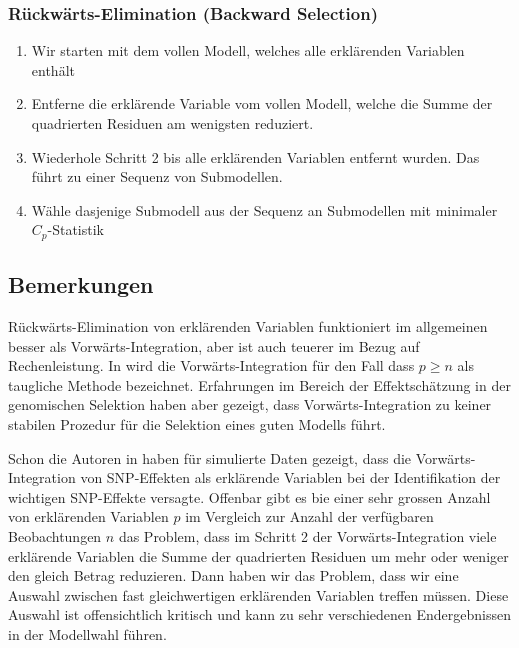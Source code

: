 \documentclass[]{book}
\providecommand{\tightlist}{%
  \setlength{\itemsep}{0pt}\setlength{\parskip}{0pt}}
\begin{document}
\subsubsection{Rückwärts-Elimination (Backward
Selection)}\label{ruckwarts-elimination-backward-selection}

\begin{enumerate}
\def\labelenumi{\arabic{enumi}.}
\tightlist
\item
  Wir starten mit dem vollen Modell, welches alle erklärenden Variablen
  enthält
\item
  Entferne die erklärende Variable vom vollen Modell, welche die Summe
  der quadrierten Residuen am wenigsten reduziert.
\item
  Wiederhole Schritt 2 bis alle erklärenden Variablen entfernt wurden.
  Das führt zu einer Sequenz von Submodellen.
\item
  Wähle dasjenige Submodell aus der Sequenz an Submodellen mit minimaler
  \(C_p\)-Statistik
\end{enumerate}

\subsection{Bemerkungen}\label{bemerkungen}

Rückwärts-Elimination von erklärenden Variablen funktioniert im
allgemeinen besser als Vorwärts-Integration, aber ist auch teuerer im
Bezug auf Rechenleistung. In \citep{BM2014} wird die
Vorwärts-Integration für den Fall dass \(p \ge n\) als taugliche Methode
bezeichnet. Erfahrungen im Bereich der Effektschätzung in der
genomischen Selektion haben aber gezeigt, dass Vorwärts-Integration zu
keiner stabilen Prozedur für die Selektion eines guten Modells führt.

Schon die Autoren in \citep{MHG2001} haben für simulierte Daten gezeigt,
dass die Vorwärts-Integration von SNP-Effekten als erklärende Variablen
bei der Identifikation der wichtigen SNP-Effekte versagte. Offenbar gibt
es bie einer sehr grossen Anzahl von erklärenden Variablen \(p\) im
Vergleich zur Anzahl der verfügbaren Beobachtungen \(n\) das Problem,
dass im Schritt 2 der Vorwärts-Integration viele erklärende Variablen
die Summe der quadrierten Residuen um mehr oder weniger den gleich
Betrag reduzieren. Dann haben wir das Problem, dass wir eine Auswahl
zwischen fast gleichwertigen erklärenden Variablen treffen müssen. Diese
Auswahl ist offensichtlich kritisch und kann zu sehr verschiedenen
Endergebnissen in der Modellwahl führen.
\end{document}
